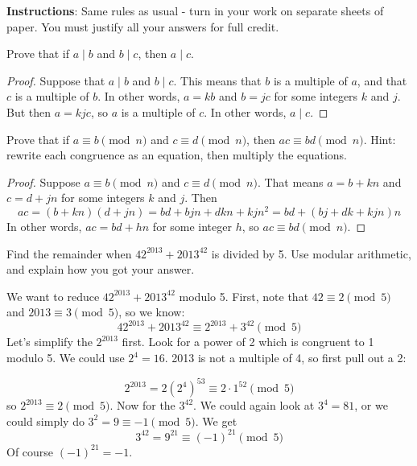\documentclass[11pt]{exam}
\begin{document}
\noindent \textbf{Instructions}: Same rules as usual - turn in your work on separate sheets of paper.  You must justify all your answers for full credit.

\begin{questions}
\question[3] Prove that if $a \mid b$ and $b \mid c$, then $a \mid c$.

\begin{solution}
\begin{proof}
Suppose that $a \mid b$ and $b \mid c$.  This means that $b$ is a multiple of $a$, and that $c$ is a multiple of $b$.  In other words, $a = kb$ and $b = jc$ for some integers $k$ and $j$.  But then $a = kjc$, so $a$ is a multiple of $c$.  In other words, $a \mid c$.
\end{proof}
\end{solution}

\question[3] Prove that if $a \equiv b \pmod{n}$ and $c \equiv d \pmod{n}$, then $ac \equiv bd \pmod{n}$.  Hint: rewrite each congruence as an equation, then multiply the equations.

\begin{solution}
\begin{proof}
	Suppose $a \equiv b \pmod{n}$ and $c \equiv d \pmod{n}$.  That means $a = b + kn$ and $c = d + jn$ for some integers $k$ and $j$.  Then
	\[ac = (b+kn)(d+jn) = bd + bjn + dkn + kjn^2 = bd + (bj+dk+kjn)n\]
	In other words, $ac = bd + hn$ for some integer $h$, so $ac \equiv bd \pmod{n}$.
\end{proof}
\end{solution}

\question[6] Find the remainder when $42^{2013} + 2013^{42}$ is divided by 5.  Use modular arithmetic, and explain how you got your answer.

\begin{solution}
We want to reduce $42^{2013} + 2013^{42}$ modulo 5.  First, note that $42 \equiv 2 \pmod 5$ and $2013 \equiv 3 \pmod 5$, so we know:
\[42^{2013} + 2013^{42} \equiv 2^{2013} + 3^{42} \pmod 5\]
Let's simplify the $2^{2013}$ first.  Look for a power of 2 which is congruent to 1 modulo 5.  We could use $2^4 = 16$.  2013 is not a multiple of 4, so first pull out a 2:

\[2^{2013} = 2(2^4)^53 \equiv 2\cdot 1^52 \pmod{5}\]
so $2^{2013} \equiv 2 \pmod 5$.  Now for the $3^42$.  We could again look at $3^4 = 81$, or we could simply do $3^2 = 9 \equiv -1 \pmod 5$.  We get
\[3^{42} = 9^{21} \equiv (-1)^{21} \pmod 5\]
Of course $(-1)^21 = -1$.  


\end{solution}
\end{questions}
\end{document}
